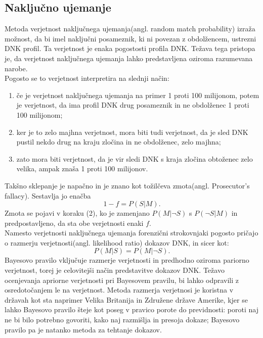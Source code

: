 \documentclass[12pt,a4paper]{amsart}
\theoremstyle{definition} %
\theoremstyle{plain} %
\begin{document}
\subsection{Naključno ujemanje}
Metoda verjetnost naključnega ujemanja(angl. random match probability) izraža možnost, da bi imel naključni posameznik, ki ni povezan z obdolžencem, 
ustrezni DNK profil. Ta verjetnost je enaka pogostosti profila DNK. Težava tega pristopa je, da verjetnost naključnega ujemanja lahko predstavljena 
oziroma razumevana narobe. \\
Pogosto se to verjetnost interpretira na slednji način:
\begin{enumerate}
    \item če je verjetnost naključnega ujemanja na primer 1 proti 100 milijonom, potem je verjetnost, da ima profil DNK drug posameznik in ne 
    obdolženec 1 proti 100 milijonom;
    \item ker je to zelo majhna verjetnost, mora biti tudi verjetnost, da je sled DNK pustil nekdo drug na kraju zločina in ne obdolženec, zelo majhna;
    \item zato mora biti verjetnost, da je vir sledi DNK s kraja zločina obtoženec zelo velika, ampak znaša 1 proti 100 milijonov.
\end{enumerate}
Takšno sklepanje je napačno in je znano kot tožilčeva zmota(angl. Prosecutor’s fallacy). Sestavlja jo enačba
\begin{equation}\label{eq:tozilcevazmota}
    1 - f = P(S \lvert M).
\end{equation}
Zmota se pojavi v koraku (2), ko je zamenjano $P(M \lvert \neg S)$ s $P(\neg S \lvert M)$ in predpostavljeno, da sta obe verjetnosti enaki $f$. \\
Namesto verjetnosti naključnega ujemanja forenzični strokovnjaki pogosto pričajo o razmerju verjetnosti(angl. likelihood ratio) dokazov DNK, in 
sicer kot:
\[
    P(M \lvert S) = P(M \lvert \neg S).
\]
Bayesovo pravilo vključuje razmerje verjetnosti in predhodno oziroma pariorno verjetnost, torej je celovitejši način predstavitve dokazov DNK. 
Težavo ocenjevanja apriorne verjetnosti pri Bayesovem pravilu, bi lahko odpravili z osredotočanjem le na verjetnost. Metoda razmerja verjetnosi je 
koristna v državah kot sta naprimer Velika Britanija in Združene države Amerike, kjer se lahko Bayesovo pravilo šteje kot poseg v pravico porote 
do previdnosti: poroti naj ne bi bilo potrebno govoriti, kako naj razmišlja in presoja dokaze; Bayesovo pravilo pa je natanko metoda za 
tehtanje dokazov.
\end{document}
